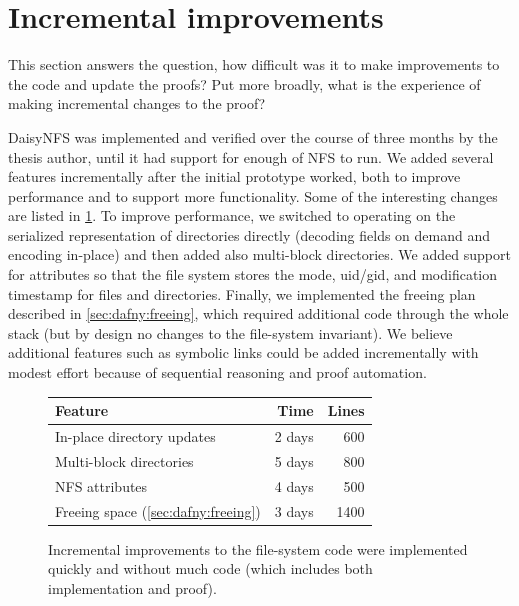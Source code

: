 
\section{Incremental improvements}
\label{sec:eval:incremental}

This section answers the question, how difficult was it to make improvements to
the code and update the proofs? Put more broadly, what is the experience of
making incremental changes to the proof?

DaisyNFS was implemented and verified over the course of three months by the
thesis author, until it had support for enough of NFS to run. We
added several features incrementally after the initial prototype
worked, both to improve performance and to support more
functionality. Some of the interesting changes are listed in
\cref{fig:features}.  To improve performance, we switched to
operating on the serialized representation of directories directly
(decoding fields on demand and encoding in-place) and then added also
multi-block directories.  We added support for attributes so that the file
system stores the mode, uid/gid, and modification timestamp for files and directories.
Finally, we implemented the freeing plan described
in \cref{sec:dafny:freeing}, which required additional code through the
whole stack (but by design no changes to the file-system invariant).
We believe additional features such as symbolic links
could be added incrementally with modest effort because
of sequential reasoning and proof automation.

\begin{figure}[ht!]
\begin{center}
\begin{tabular}{lrr}
  \toprule
  \textbf{Feature} & \textbf{Time} & \textbf{Lines} \\
  \midrule
  In-place directory updates & 2 days & 600\\
  Multi-block directories & 5 days & 800 \\
  NFS attributes & 4 days & 500 \\
  Freeing space (\cref{sec:dafny:freeing}) & 3 days & 1400\\
  \bottomrule
\end{tabular}
\end{center}
\caption{Incremental improvements to the file-system code were implemented
  quickly and without much code (which includes both implementation and proof).}
\label{fig:features}
\end{figure}

